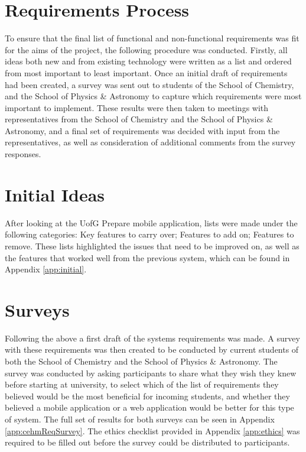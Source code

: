 \documentclass{l4proj}
\begin{document}
\section{Requirements Process}
To ensure that the final list of functional and non-functional requirements was fit for the aims of the project,  the following procedure was conducted. Firstly,  all ideas both new and from existing technology were written as a list and ordered from most important to least important. Once an initial draft of requirements had been created,  a survey was sent out to students of the School of Chemistry,  and the School of Physics \& Astronomy to capture which requirements were most important to implement. These results were then taken to meetings with representatives from the School of Chemistry and the School of Physics \& Astronomy,  and a final set of requirements was decided with input from the representatives,  as well as consideration of additional comments from the survey responses.

\section{Initial Ideas}
After looking at the UofG Prepare mobile application,  lists were made under the following categories: Key features to carry over; Features to add on; Features to remove. These lists highlighted the issues that need to be improved on,  as well as the features that worked well from the previous system,  which can be found in Appendix \ref{app:initial}.


\section{Surveys} \label{surveys}
Following the above a first draft of the systems requirements was made. A survey with these requirements was then created to be conducted by current students of both the School of Chemistry and the School of Physics \& Astronomy. The survey was conducted by asking participants to share what they wish they knew before starting at university,  to select which of the list of requirements they believed would be the most beneficial for incoming students,  and whether they believed a mobile application or a web application would be better for this type of system. The full set of results for both surveys can be seen in Appendix \ref{app:cehmReqSurvey}. The ethics checklist provided in Appendix \ref{app:ethics} was required to be filled out before the survey could be distributed to participants. 
\end{document}
